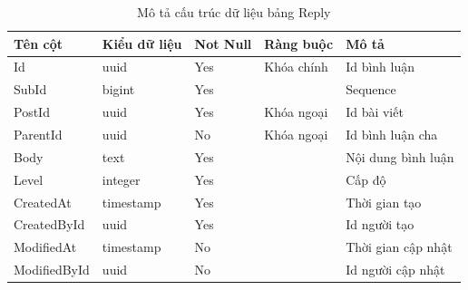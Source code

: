 \documentclass[../index.tex]{subfiles}
\begin{document}
    \begin{table}[H]
        \begin{tabular}{ |p{3cm}|p{2.5cm}|p{1.6cm}|p{2.2cm}|p{3cm}| }
            \hline
            Tên cột      & Kiểu dữ liệu             & Not Null & Ràng buộc  & Mô tả              \\
            \hline
            Id           & uuid                     & Yes      & Khóa chính & Id bình luận       \\
            \hline
            SubId        & bigint                   & Yes      &            & Sequence           \\
            \hline
            PostId       & uuid                     & Yes      & Khóa ngoại & Id bài viết        \\
            \hline
            ParentId     & uuid                     & No       & Khóa ngoại & Id bình luận cha   \\
            \hline
            Body         & text                     & Yes      &            & Nội dung bình luận \\
            \hline
            Level        & integer                  & Yes      &            & Cấp độ             \\
            \hline
            CreatedAt    & timestamp & Yes      &            & Thời gian tạo      \\
            \hline
            CreatedById  & uuid                     & Yes      &            & Id người tạo       \\
            \hline
            ModifiedAt   & timestamp & No       &            & Thời gian cập nhật \\
            \hline
            ModifiedById & uuid                     & No       &            & Id người cập nhật  \\
            \hline
        \end{tabular}
        \caption{Mô tả cấu trúc dữ liệu bảng Reply}
    \end{table}
\end{document}
